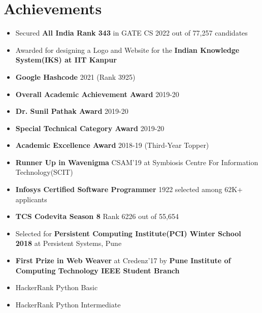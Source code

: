 \documentclass[10.8pt, a4paper]{extarticle}
\newcommand{\shorterSection}[1]{\vspace{-10pt}\section{#1}}
\begin{document}
\shorterSection{Achievements}
\begin{itemize}
  \item Secured \textbf{All India Rank 343} in GATE CS 2022 out of 77,257 candidates\\[-0.6cm]
  \item Awarded for designing a Logo and Website for the \textbf{Indian Knowledge System(IKS) at IIT Kanpur}\\[-0.6cm]
  \item \textbf{Google Hashcode} 2021 (Rank 3925)\\[-0.6cm]
  \item \textbf{Overall Academic Achievement Award} 2019-20\\[-0.6cm]
  \item \textbf{Dr. Sunil Pathak Award} 2019-20\\[-0.6cm]
  \item \textbf{Special Technical Category Award} 2019-20\\[-0.6cm]
  \item \textbf{Academic Excellence Award} 2018-19 (Third-Year Topper)\\[-0.6cm]
  \item \textbf{Runner Up in Wavenigma} CSAM'19 at Symbiosis Centre For Information Technology(SCIT) \\[-0.6cm]
  \item \textbf{Infosys Certified Software Programmer} 1922 selected among 62K+ applicants\\[-0.6cm]
  \item \textbf{TCS Codevita Season 8} Rank 6226 out of 55,654\\[-0.6cm]
  \item Selected for \textbf{Persistent Computing Institute(PCI) Winter School 2018} at Persistent Systems, Pune\\[-0.6cm]
  \item \textbf{First Prize in Web Weaver} at Credenz'17 by \textbf{Pune Institute of Computing Technology IEEE Student Branch}\\[-0.6cm]
  \item HackerRank Python Basic\\[-0.6cm]
  \item HackerRank Python Intermediate\\[-0.6cm]
\end{itemize}
\medskip
\end{document}
